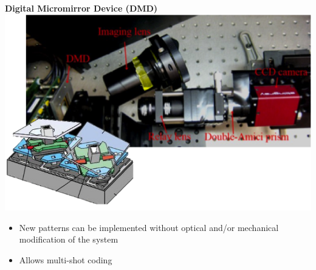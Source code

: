 \documentclass{beamer}
\begin{document}
\begin{frame}
\begin{columns}
\begin{column}{2.5in}
\vspace{-25pt}
\begin{center}
\textbf{Digital Micromirror Device (DMD)}\\
\vspace{10pt}
\includegraphics[scale=0.35]{FiguresUpd/dmddmd.png}\\
\end{center}

\begin{itemize}
\item \small New patterns can be implemented without optical and/or mechanical modification of the system
\item \small Allows multi-shot coding
\end{itemize}

\end{column}

\end{columns}

\end{frame}

\end{document}
